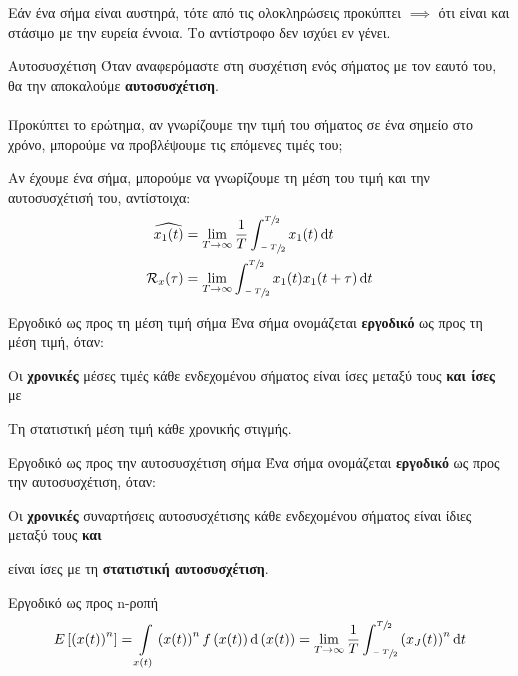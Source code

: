 \documentclass[11pt,a4paper,notitlepage,fleqn,draft]{article}
\begin{document}
Εάν ένα σήμα είναι αυστηρά, τότε από τις ολοκληρώσεις προκύπτει
\( \implies \) ότι είναι και στάσιμο με την ευρεία έννοια. Το
αντίστροφο δεν ισχύει εν γένει.

\begin{defn}{Αυτοσυσχέτιση}{}
	Όταν αναφερόμαστε στη συσχέτιση ενός σήματος με τον εαυτό του,
	θα την αποκαλούμε \textbf{αυτοσυσχέτιση}.
\end{defn}

\paragraph{}
Προκύπτει το ερώτημα, αν γνωρίζουμε την τιμή του σήματος σε ένα
σημείο στο χρόνο, μπορούμε να προβλέψουμε τις επόμενες τιμές του;

Αν έχουμε ένα σήμα, μπορούμε να γνωρίζουμε τη μέση του τιμή και την
αυτοσυσχέτισή του, αντίστοιχα:
\begin{align*}
	\widehat{x_1(t)} &= \lim_{T\to \infty} \frac{1}{T}
	\int_{\sfrac{-T}{2} }^{\sfrac{T}{2} } x_1(t)\mathop{}\!\mathrm{d} t
	\\
	\mathcal{R}_x(\tau) &= \lim_{T\to \infty}
	\int_{\sfrac{-T}{2} }^{\sfrac{T}{2} } x_1(t)x_1(t+\tau)\mathop{}\!\mathrm{d} t
\end{align*}

\begin{defn}{Εργοδικό ως προς τη μέση τιμή σήμα}{}
	Ένα σήμα ονομάζεται \textbf{εργοδικό} ως προς τη μέση τιμή, όταν:
	\begin{enumparen}
		\item Οι \textbf{χρονικές} μέσες τιμές κάθε ενδεχομένου σήματος
		είναι ίσες μεταξύ τους \textbf{και ίσες} με
		\item Τη στατιστική μέση τιμή κάθε χρονικής στιγμής.
	\end{enumparen}
\end{defn}

\begin{defn}{Εργοδικό ως προς την αυτοσυσχέτιση σήμα}{}
	Ένα σήμα ονομάζεται \textbf{εργοδικό} ως προς την αυτοσυσχέτιση,
	όταν:
	\begin{enumparen}
		\item Οι \textbf{χρονικές} συναρτήσεις αυτοσυσχέτισης
		κάθε ενδεχομένου σήματος
		είναι ίδιες μεταξύ τους \textbf{και}
		\item είναι ίσες με τη \textbf{στατιστική αυτοσυσχέτιση}.
	\end{enumparen}
\end{defn}

\begin{defn}{Εργοδικό ως προς n-ροπή}{}
	\[
	E\left[\left(x(t)\right)^n\right] =
	\int\limits_{x(t)} \left(x(t)\right)^n
	f\left(x(t)\right) \mathop{}\!\mathrm{d}\left(x(t)\right)
	= \lim_{T\to \infty} \frac{1}{T}
	\int_{\sfrac{-T}{2} }^{\sfrac{T}{2} }
	\left(x_J(t)\right)^n \mathop{}\!\mathrm{d} t
	\]
\end{defn}
\end{document}
